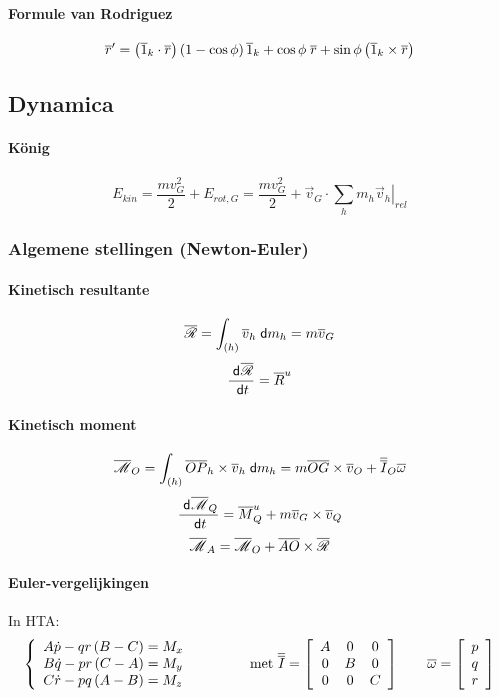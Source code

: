 \paragraph{Formule van Rodriguez}
\[
  \overline{r}' = \left(\overline{1}_k \cdot \overline{r} \right)\left(1 - \cos{\phi}\right)\overline{1}_k + \cos{\phi}\; \overline{r} + \sin{\phi}\left( \overline{1}_k \times \overline{r} \right)
\]

\subsection{Dynamica}

\paragraph{König}
\[
  E_{kin} = \frac{mv_G^2}{2} + E_{rot,G}
          = \frac{mv_G^2}{2} + \vec{v}_G \cdot \sum_h m_h \left.\vec{v}_h \right|_{rel}
\]

\subsubsection{Algemene stellingen (Newton-Euler)}
\paragraph{Kinetisch resultante}
\[
  \overline{\mathscr{R}} = \int_{(h)} \overline{v}_h \;\textsf{d}m_h
    = m \overline{v}_G
\]
\[
  \frac{\;\textsf{d}^{}{\overline{\mathscr{R}}}}{\;\textsf{d}t^{}} = \overline{R}^u
\]

\paragraph{Kinetisch moment}
\[
  \overline{\mathscr{M}}_O = \int_{(h)} \overline{OP}_h \times \overline{v}_h \;\textsf{d}m_h
    = m \overline{OG} \times \overline{v}_O + \overline{\overline{I}}_O \overline{\omega}
\]
\[
  \frac{\;\textsf{d}^{}{\overline{\mathscr{M}}_Q}}{\;\textsf{d}t^{}} = \overline{M}^u_Q + m \overline{v}_G \times \overline{v}_Q
\]
\[
  \overline{\mathscr{M}}_A = \overline{\mathscr{M}}_O + \overline{AO} \times \overline{\mathscr{R}}
\]


\paragraph{Euler-vergelijkingen}

In HTA:
\[
\left\{
  \begin{array}{l@{\;=\;}l}
    A \dt{p} - qr\left(B-C \right) & M_x\\
    B \dt{q} - pr\left(C-A \right) & M_y\\
    C \dt{r} - pq\left(A-B \right) & M_z
  \end{array}
\right.
\qquad \qquad \mbox{met }
 \vect{\vect{I}} =
  \left[
    \begin{array}{ccc}
      A & 0 & 0\\
      0 & B & 0\\
      0 & 0 & C
    \end{array}
  \right]
 \qquad
 \vec{\omega} =
  \left[
    \begin{array}{c}
      p \\
      q \\
      r
    \end{array}
  \right]
\]


